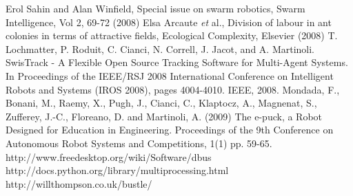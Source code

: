 \documentclass{llncs}
\begin{document}
\begin{thebibliography}{}
%
%
Erol Sahin and Alan Winfield, Special issue on swarm robotics, Swarm Intelligence, Vol 2, 69-72 (2008)
Elsa Arcaute \textit{et} al., Division of labour in ant colonies in terms of attractive fields, Ecological Complexity, Elsevier (2008)
T. Lochmatter, P. Roduit, C. Cianci, N. Correll, J. Jacot, and A. Martinoli. SwisTrack - A Flexible Open Source Tracking Software for Multi-Agent Systems. In Proceedings of the IEEE/RSJ 2008 International Conference on Intelligent Robots and Systems (IROS 2008), pages 4004-4010. IEEE, 2008.
Mondada, F., Bonani, M., Raemy, X., Pugh, J., Cianci, C., Klaptocz, A., Magnenat, S., Zufferey, J.-C., Floreano, D. and Martinoli, A. (2009) The e-puck, a Robot Designed for Education in Engineering. Proceedings of the 9th Conference on Autonomous Robot Systems and Competitions, 1(1) pp. 59-65.
http://www.freedesktop.org/wiki/Software/dbus
http://docs.python.org/library/multiprocessing.html
http://willthompson.co.uk/bustle/
\end{thebibliography}
%
\end{document}
